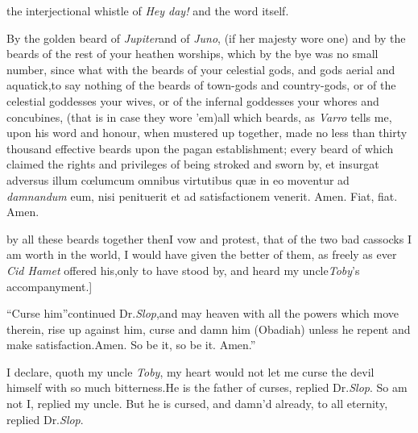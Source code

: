 \documentclass{article}
\begin{document}
\noindent
{}

\noindent
{}
\stick{[Here my uncle \textit{Toby} throwing back his}
\newpage
\null
\newpage
\noindent
the interjectional whistle of \textit{Hey day!} and the word itself.\tsh

\tsk By the golden beard of \textit{Jupiter}\tsk and of \textit{Juno}, (if her
majesty wore one) and by the beards of the rest of your heathen worships, which by
the bye was no small number, since what with the beards of your celestial gods, and
gods aerial and aquatick,\tsk to say nothing of the beards of town-gods and
country-gods, or of the celestial goddesses your wives, or of the infernal goddesses
your whores and concubines, (that is in case they wore ’em)\tsh all which beards, as
\textit{Varro} tells me, upon his word and honour, when mustered up together, made
no less than thirty thousand effective beards upon the pagan establishment;\tsh
every beard of which claimed the rights and privileges of being
stroked and sworn
by,\tsk{}
\null
\vfill
\noindent
\tsh et insurgat adversus illum cœlum\break cum omnibus virtutibus quæ in eo mo\-ventur ad \textit{damnandum}
eum, nisi peni\-tu\-erit et ad satisfactionem venerit. \hfill Amen.\break
Fiat, fiat. \quad Amen.
\vfill
\newpage

\noindent
by all these beards together
then\tsh I vow and protest, that of the two bad cassocks I
am worth in the world, I would have given the better of them, as
freely as ever \textit{Cid Hamet} offered his,\tsh only to have
stood by, and heard my uncle\break \textit{Toby}’s accompanyment.]

\tsh “Curse him”\tsh continued\break
Dr.\@ \textit{Slop},\tsh\lqq and may heaven with\break
\lqq all the powers which move therein,\break
\lqq rise up against him, curse and damn\break
\lqq him (Obadiah) unless he repent and\break
\lqq make satisfaction.\quad Amen. So be it,\break
\lqq \tsk so be it. Amen.”

I declare, quoth my uncle \textit{Toby}, my heart would not let me
curse the devil himself with so much bitterness.\tsk He is the
father of curses, replied Dr.\@ \textit{Slop}.\break
\tsh So am not I, replied my uncle.\tsh{}
But he is cursed, and damn’d already, to all eternity, replied Dr.\@ \textit{Slop}.
\end{document}
